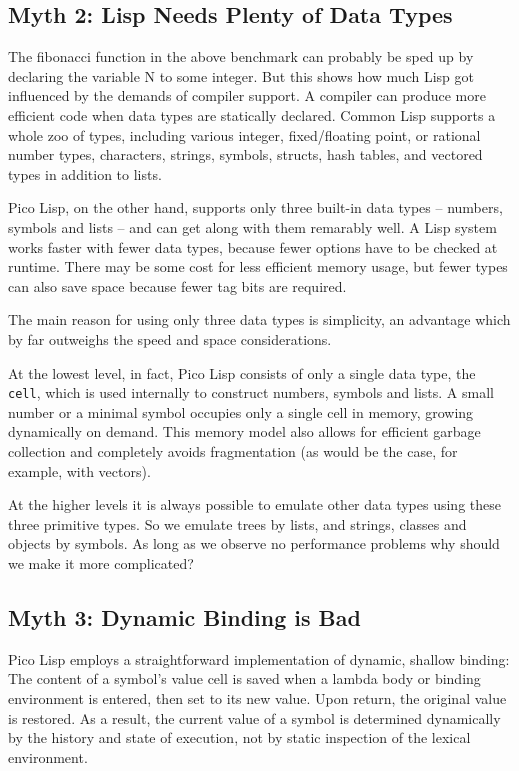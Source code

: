 \subsection{Myth 2: Lisp Needs Plenty of Data Types}
\label{sec:rad-myth-data-types}

The fibonacci function in the above benchmark can probably be sped up by
declaring the variable N to some integer. But this shows how much Lisp got
influenced by the demands of compiler support. A compiler can produce more
efficient code when data types are statically declared. Common Lisp supports a
whole zoo of types, including various integer, fixed/floating point, or rational
number types, characters, strings, symbols, structs, hash tables, and vectored
types in addition to lists.

Pico Lisp, on the other hand, supports only three built-in data types --
numbers, symbols and lists -- and can get along with them remarably well. A Lisp
system works faster with fewer data types, because fewer options have to be
checked at runtime. There may be some cost for less efficient memory usage, but
fewer types can also save space because fewer tag bits are required.

The main reason for using only three data types is simplicity, an advantage
which by far outweighs the speed and space considerations.

At the lowest level, in fact, Pico Lisp consists of only a single data type, the
\texttt{cell}, which is used internally to construct numbers, symbols and lists.
A small number or a minimal symbol occupies only a single cell in memory,
growing dynamically on demand. This memory model also allows for efficient
garbage collection and completely avoids fragmentation (as would be the case,
for example, with vectors).

At the higher levels it is always possible to emulate other data types using
these three primitive types. So we emulate trees by lists, and strings, classes
and objects by symbols. As long as we observe no performance problems why should
we make it more complicated?


\subsection{Myth 3: Dynamic Binding is Bad}
\label{sec:rad-myth-dyn-binding}

Pico Lisp employs a straightforward implementation of dynamic, shallow binding:
The content of a symbol's value cell is saved when a lambda body or binding
environment is entered, then set to its new value. Upon return, the original
value is restored. As a result, the current value of a symbol is determined
dynamically by the history and state of execution, not by static inspection of
the lexical environment.

